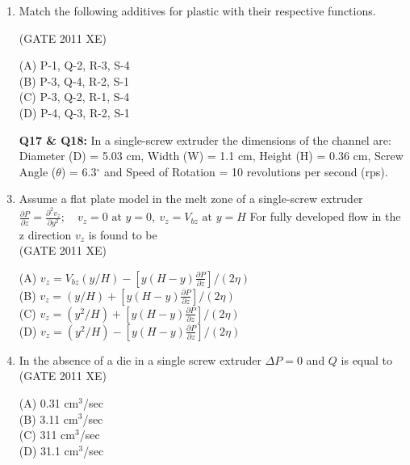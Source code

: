 \documentclass[journal,12pt,onecolumn]{IEEEtran}
\begin{document}
\begin{enumerate}
\begin{enumerate}
\begin{enumerate}[label=\arabic*)]
\newpage

\item Match the following additives for plastic with their respective functions.



\hfill{(GATE 2011 XE)} \\
\begin{multicols}{2}

(A) P-1, Q-2, R-3, S-4\\
(B) P-3, Q-4, R-2, S-1\\
(C) P-3, Q-2, R-1, S-4\\
(D) P-4, Q-3, R-2, S-1
\end{multicols}


\item[\textbf{Q17 \& Q18:}] In a single-screw extruder the dimensions of the channel are: Diameter (D) = 5.03 cm, Width (W) = 1.1 cm, Height (H) = 0.36 cm, Screw Angle ($\theta$) = 6.3$^\circ$ and Speed of Rotation = 10 revolutions per second (rps).\\

\item Assume a flat plate model in the melt zone of a single-screw extruder
$
\frac{\partial P}{\partial z} = \frac{\partial^2 v_z}{\partial y^2};\quad v_z = 0 \text{ at } y=0, \ v_z = V_{bz} \text{ at } y=H$
For fully developed flow in the z direction $v_z$ is found to be\\

\hfill{(GATE 2011 XE)} \\
\begin{multicols}{2}
(A) $v_z = V_{bz}(y/H) - [y(H-y) \frac{\partial P}{\partial z}]/(2\eta)$\\
(B) $v_z = (y/H) + [y(H-y) \frac{\partial P}{\partial z}]/(2\eta)$\\
(C) $v_z = (y^2/H) + [y(H-y) \frac{\partial P}{\partial z}]/(2\eta)$\\
(D) $v_z = (y^2/H) - [y(H-y) \frac{\partial P}{\partial z}]/(2\eta)$
\end{multicols}

\item In the absence of a die in a single screw extruder $\Delta P = 0$ and $Q$ is equal to\\

\hfill{(GATE 2011 XE)} \\
\begin{multicols}{4}
(A) 0.31 cm$^3$/sec\\
(B) 3.11 cm$^3$/sec\\
(C) 311 cm$^3$/sec\\
(D) 31.1 cm$^3$/sec
\end{multicols}


\end{enumerate}
\end{enumerate}
\end{enumerate}
\end{document}
